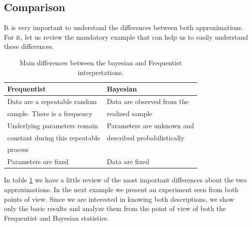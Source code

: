 \documentclass[onecolumn,           %
               showpacs,            %
               preprintnumbers,     %
               aps,                 %
               letterpaper,             %
               superscriptaddress,      %
               nofootinbib,         %
               tightenlines,        %
               floats,floatfix      %
               ,usenatbib,
               ]{revtex4-1}
\begin{document}
\subsection{Comparison}

It is very important to understand the differences between both approximations. For it, let us review the mandatory example that can help us to easily understand these differences.
\begin{table}[h!]
\centering
\begin{tabular}{||l|l||} 
 \hline
 \textbf{Frequentist} & \textbf{Bayesian} \\ [0.5ex] 
 \hline\hline
 Data are a repeatable random  & Data are observed from the   \\ 
 sample. There is a frequency & realized sample \\
 \hline 
 Underlying parameters remain & Parameters are unknown and \\
 constant during this repeatable & described probabilistically \\
 process &  \\
\hline
Parameters are fixed & Data are fixed\\ [1ex] 
 \hline
\end{tabular}
\caption{\footnotesize{Main differences between the bayesian and Frequentist interpretations.}}
\label{table:1}
\end{table}

In table \ref{table:1} we have a little review of the most important differences about the two approximations. In the next example we present an experiment seen from both points of view. Since we are interested in knowing both descriptions, we show only the basic results and analyze them from the point of view of both the Frequentist and Bayesian statistics. 
\end{document}
